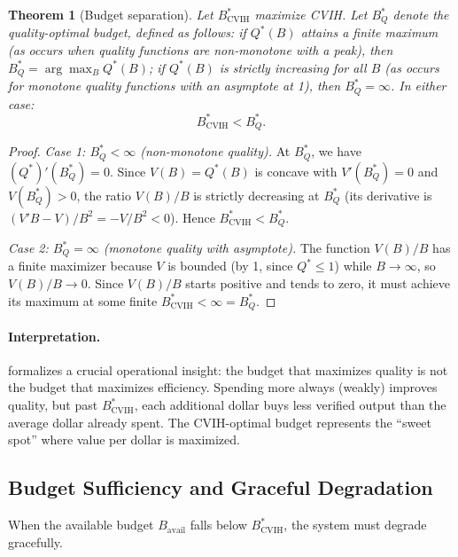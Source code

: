 \documentclass[11pt, a4paper, logo, copyright]{googledeepmind}
\newtheorem{theorem}{Theorem}[section]
\begin{document}
\begin{theorem}[Budget separation]\label{thm:budget-separation}
Let $B^*_{\text{CVIH}}$ maximize CVIH. Let $B^*_Q$ denote the quality-optimal budget, defined as follows: if $Q^*(B)$ attains a finite maximum (as occurs when quality functions are non-monotone with a peak), then $B^*_Q = \arg\max_B Q^*(B)$; if $Q^*(B)$ is strictly increasing for all $B$ (as occurs for monotone quality functions with an asymptote at 1), then $B^*_Q = \infty$. In either case:
\begin{equation}\label{eq:budget-sep}
    B^*_{\text{CVIH}} < B^*_Q.
\end{equation}
\end{theorem}

\begin{proof}
\emph{Case 1: $B^*_Q < \infty$ (non-monotone quality).} At $B^*_Q$, we have $(Q^*)'(B^*_Q) = 0$. Since $V(B) = Q^*(B)$ is concave with $V'(B^*_Q) = 0$ and $V(B^*_Q) > 0$, the ratio $V(B)/B$ is strictly decreasing at $B^*_Q$ (its derivative is $(V'B - V)/B^2 = -V/B^2 < 0$). Hence $B^*_{\text{CVIH}} < B^*_Q$.

\emph{Case 2: $B^*_Q = \infty$ (monotone quality with asymptote).} The function $V(B)/B$ has a finite maximizer because $V$ is bounded (by 1, since $Q^* \leq 1$) while $B \to \infty$, so $V(B)/B \to 0$. Since $V(B)/B$ starts positive and tends to zero, it must achieve its maximum at some finite $B^*_{\text{CVIH}} < \infty = B^*_Q$.
\end{proof}

\paragraph{Interpretation.}
 formalizes a crucial operational insight: the budget that maximizes quality is not the budget that maximizes efficiency. Spending more always (weakly) improves quality, but past $B^*_{\text{CVIH}}$, each additional dollar buys less verified output than the average dollar already spent. The CVIH-optimal budget represents the ``sweet spot'' where value per dollar is maximized.

\subsection{Budget Sufficiency and Graceful Degradation}

When the available budget $B_{\text{avail}}$ falls below $B^*_{\text{CVIH}}$, the system must degrade gracefully.
\end{document}
